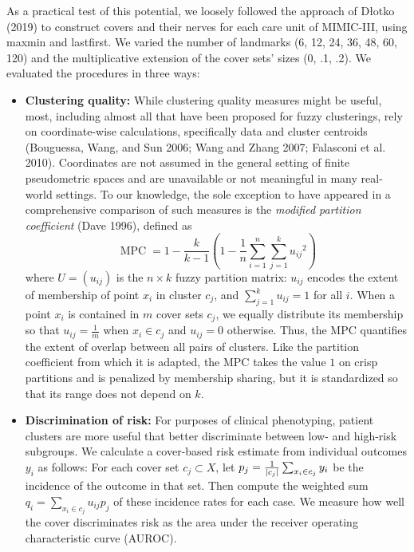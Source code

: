 \documentclass{article}
\providecommand{\tightlist}{%
  \setlength{\itemsep}{0pt}\setlength{\parskip}{0pt}}
\begin{document}
As a practical test of this potential, we loosely followed the approach
of Dłotko (2019) to construct covers and their nerves for each care unit
of MIMIC-III, using maxmin and lastfirst. We varied the number of
landmarks (6, 12, 24, 36, 48, 60, 120) and the multiplicative extension
of the cover sets' sizes (0, .1, .2). We evaluated the procedures in
three ways:

\begin{itemize}
\tightlist
\item
  \textbf{Clustering quality:} While clustering quality measures might
  be useful, most, including almost all that have been proposed for
  fuzzy clusterings, rely on coordinate-wise calculations, specifically
  data and cluster centroids (Bouguessa, Wang, and Sun 2006; Wang and
  Zhang 2007; Falasconi et al. 2010). Coordinates are not assumed in the
  general setting of finite pseudometric spaces and are unavailable or
  not meaningful in many real-world settings. To our knowledge, the sole
  exception to have appeared in a comprehensive comparison of such
  measures is the \emph{modified partition coefficient} (Dave 1996),
  defined as
  \[\operatorname{MPC}=1-\frac{k}{k-1}(1-\frac{1}{n}\sum_{i=1}^{n}{\sum_{j=1}^{k}{{u_{ij}}^2}})\]
  where \(U=(u_{ij})\) is the \(n\times k\) fuzzy partition matrix:
  \(u_{ij}\) encodes the extent of membership of point \(x_i\) in
  cluster \(c_j\), and \(\sum_{j=1}^{k}{u_{ij}}=1\) for all \(i\). When
  a point \(x_i\) is contained in \(m\) cover sets \(c_j\), we equally
  distribute its membership so that \(u_{ij}=\frac{1}{m}\) when
  \(x_i\in c_j\) and \(u_{ij}=0\) otherwise. Thus, the MPC quantifies
  the extent of overlap between all pairs of clusters. Like the
  partition coefficient from which it is adapted, the MPC takes the
  value \(1\) on crisp partitions and is penalized by membership
  sharing, but it is standardized so that its range does not depend on
  \(k\).
\item
  \textbf{Discrimination of risk:} For purposes of clinical phenotyping,
  patient clusters are more useful that better discriminate between low-
  and high-risk subgroups. We calculate a cover-based risk estimate from
  individual outcomes \(y_i\) as follows: For each cover set
  \(c_j\subset X\), let
  \(p_j=\frac{1}{\lvert c_j\rvert}\sum_{x_i\in c_j}{y_i}\) be the incidence of
  the outcome in that set. Then compute the weighted sum
  \(q_i=\sum_{x_i\in c_j}{u_{ij}p_j}\) of these incidence rates for each
  case. We measure how well the cover discriminates risk as the area
  under the receiver operating characteristic curve (AUROC).
\end{itemize}
\end{document}
